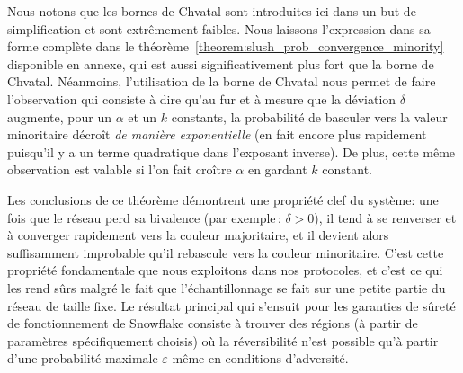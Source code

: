 \documentclass[a4,twocolumn,10pt]{article}
\theoremstyle{definition}
\begin{document}

Nous notons que les bornes de Chvatal sont introduites ici dans un but de simplification et sont extrêmement faibles.
Nous laissons l'expression dans sa forme complète dans le théorème~\ref{theorem:slush_prob_convergence_minority}
disponible en annexe, qui est aussi significativement plus fort que la borne de Chvatal.
Néanmoins, l'utilisation de la borne de Chvatal nous permet de faire l'observation qui consiste à dire qu'au fur et à
mesure que la déviation $\delta$ augmente, pour un $\alpha$ et un $k$ constants, la probabilité de basculer vers la
valeur minoritaire décroît \emph{de manière exponentielle} (en fait encore plus rapidement puisqu'il y a un terme
quadratique dans l'exposant inverse). De plus, cette même observation est valable si l'on fait croître $\alpha$ en gardant
$k$ constant.

Les conclusions de ce théorème démontrent une propriété clef du système: une fois que le réseau perd sa bivalence
(par exem\-ple\,: $\delta > 0$), il tend à se renverser et à converger rapidement vers la couleur majoritaire, et il devient alors
suffisamment improbable qu'il rebascule vers la couleur minoritaire. C'est cette propriété fondamentale que nous
exploitons dans nos protocoles, et c'est ce qui les rend sûrs malgré le fait que l'échantillonnage se fait sur une petite
partie du réseau de taille fixe. Le résultat principal qui s'ensuit pour les garanties de sûreté de fonctionnement de Snowflake consiste
à trouver des régions (à partir de paramètres spécifiquement choisis) où la réversibilité n'est possible qu'à partir
d'une probabilité maximale $\varepsilon$ même en conditions d'adversité.

\end{document}
